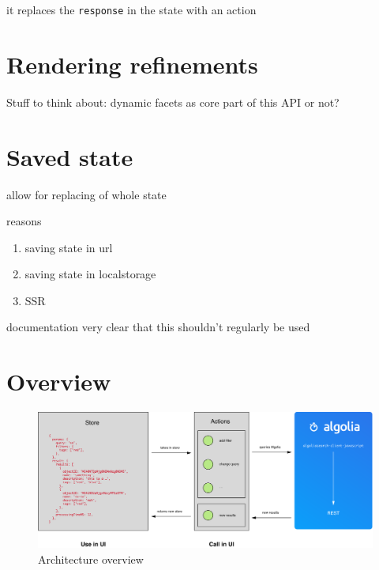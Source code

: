 it replaces the {\tt response} in the state with an action


\section{Rendering refinements} %
\label{sec:rendering_refinements}

Stuff to think about: dynamic facets as core part of this API or not?


\section{Saved state} %
\label{sec:saved_state}

allow for replacing of whole state

reasons

\begin{enumerate}
  \item saving state in url
  \item saving state in localstorage
  \item SSR
\end{enumerate}

documentation very clear that this shouldn't regularly be used


\section{Overview} %
\label{sec:overview}

\begin{figure}[H]
  \label{figure:company-logo}
  \centering
  \includegraphics[width=\textwidth]{../assets/architecture.pdf}
  \caption{Architecture overview\cite{blog-architecture}}
\end{figure}

